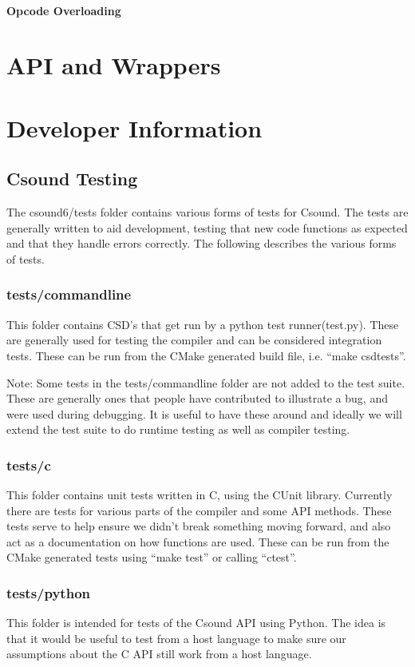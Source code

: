 \documentclass[]{book}
\begin{document}
\subsubsection{Opcode Overloading}


\chapter{API and Wrappers}



\chapter{Developer Information}

\section{Csound Testing}

The csound6/tests folder contains various forms of tests for Csound. The
tests are generally written to aid development, testing that new code
functions as expected and that they handle errors correctly. The
following describes the various forms of tests.

\subsection{tests/commandline}

This folder contains CSD's that get run by a python test
runner(test.py). These are generally used for testing the compiler and
can be considered integration tests. These can be run from the CMake
generated build file, i.e. ``make csdtests''.

Note: Some tests in the tests/commandline folder are not added to the
test suite. These are generally ones that people have contributed to
illustrate a bug, and were used during debugging. It is useful to have
these around and ideally we will extend the test suite to do runtime
testing as well as compiler testing.

\subsection{tests/c}

This folder contains unit tests written in C, using the CUnit library.
Currently there are tests for various parts of the compiler and some API
methods. These tests serve to help ensure we didn't break something
moving forward, and also act as a documentation on how functions are
used. These can be run from the CMake generated tests using ``make
test'' or calling ``ctest''.

\subsection{tests/python}

This folder is intended for tests of the Csound API using Python. The
idea is that it would be useful to test from a host language to make
sure our assumptions about the C API still work from a host language.
\end{document}
